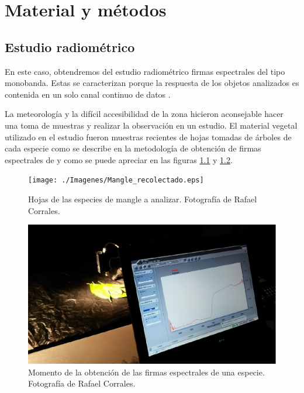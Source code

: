 


\chapter{Material y métodos}
\label{cap:materialymetodos}

\section{Estudio radiométrico}
En este caso, obtendremos del estudio radiométrico firmas espectrales del tipo monobanda. Estas se caracterizan porque la respuesta de los objetos analizados es contenida en un solo canal continuo de datos \citep{andinofase1}.%

La meteorología y la difícil accesibilidad de la zona hicieron aconsejable hacer una toma de muestras y realizar la observación en un estudio. El material vegetal utilizado en el estudio fueron muestras recientes de hojas tomadas de árboles de cada especie como se describe en la metodología de obtención de firmas espectrales de \cite{andinofase2} y como se puede apreciar en las figuras \ref{fig:mangle_recolectado} y \ref{fig:curva_espectral}.

\begin{figure}
	\centering
	\texttt{[image: ./Imagenes/Mangle\_recolectado.eps]}
	\caption[Mangle recolectado]{Hojas de las especies de mangle a analizar. Fotografía de Rafael Corrales.}
	\label{fig:mangle_recolectado}
\end{figure}

\begin{figure}
	\centering
	\includegraphics[width=0.9\linewidth]{./Imagenes/Curva_espectral.eps}
	\caption[Obtención de firmas]{Momento de la obtención de las firmas espectrales de una especie. Fotografía de Rafael Corrales.}
	\label{fig:curva_espectral}
\end{figure}

